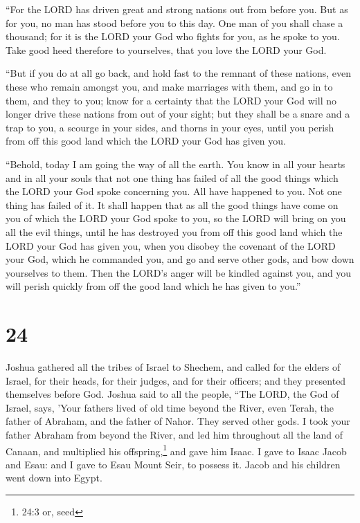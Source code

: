  ``For the LORD has driven great and strong nations out from
before you. But as for you, no man has stood before you to this day.
 One man of you shall chase a thousand; for it is the LORD
your God who fights for you, as he spoke to you.  Take good
heed therefore to yourselves, that you love the LORD your God.

 ``But if you do at all go back, and hold fast to the
remnant of these nations, even these who remain amongst you, and make
marriages with them, and go in to them, and they to you; 
know for a certainty that the LORD your God will no longer drive these
nations from out of your sight; but they shall be a snare and a trap to
you, a scourge in your sides, and thorns in your eyes, until you perish
from off this good land which the LORD your God has given you.

 ``Behold, today I am going the way of all the earth. You
know in all your hearts and in all your souls that not one thing has
failed of all the good things which the LORD your God spoke concerning
you. All have happened to you. Not one thing has failed of it.
 It shall happen that as all the good things have come on
you of which the LORD your God spoke to you, so the LORD will bring on
you all the evil things, until he has destroyed you from off this good
land which the LORD your God has given you,  when you
disobey the covenant of the LORD your God, which he commanded you, and
go and serve other gods, and bow down yourselves to them. Then the
LORD's anger will be kindled against you, and you will perish quickly
from off the good land which he has given to you.''

\hypertarget{section-23}{%
\section{24}\label{section-23}}

 Joshua gathered all the tribes of Israel to Shechem, and
called for the elders of Israel, for their heads, for their judges, and
for their officers; and they presented themselves before God.
 Joshua said to all the people, ``The LORD, the God of
Israel, says, 'Your fathers lived of old time beyond the River, even
Terah, the father of Abraham, and the father of Nahor. They served other
gods.  I took your father Abraham from beyond the River, and
led him throughout all the land of Canaan, and multiplied his
offspring,\footnote{24:3 or, seed} and gave him Isaac.  I
gave to Isaac Jacob and Esau: and I gave to Esau Mount Seir, to possess
it. Jacob and his children went down into Egypt.

